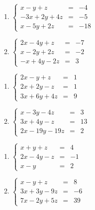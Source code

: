 \begin{multicols}{2}
\begin{enumerate}
\setcounter{enumi}{\value{HW}}


\item $\left\{ \begin{array}{rcr} x-y+z & = & -4 \\ -3x+2y+4z & = & -5 \\ x-5y+2z & = & -18  \end{array} \right.$
\item $\left\{ \begin{array}{rcr} 2x-4y+z & = & -7 \\ x-2y+2z & = & -2 \\ -x+4y-2z & = & 3  \end{array} \right.$


\setcounter{HW}{\value{enumi}}
\end{enumerate}
\end{multicols}



\begin{multicols}{2}
\begin{enumerate}
\setcounter{enumi}{\value{HW}}


\item $\left\{ \begin{array}{rcr} 2x-y+z & = & 1 \\ 2x+2y-z & = & 1 \\ 3x+6y+4z & = & 9  \end{array} \right.$
\item $\left\{ \begin{array}{rcr} x-3y-4z & = & 3 \\ 3x+4y-z & = & 13 \\ 2x-19y-19z & = & 2  \end{array} \right.$


\setcounter{HW}{\value{enumi}}
\end{enumerate}
\end{multicols}



\begin{multicols}{2}
\begin{enumerate}
\setcounter{enumi}{\value{HW}}


\item $\left\{ \begin{array}{rcr} x+y+z & = & 4 \\ 2x-4y-z& = & -1 \\ x-y & = & 2 \end{array} \right.$
\item $\left\{ \begin{array}{rcr} x-y+z & = & 8 \\ 3x+3y-9z & = & -6 \\  7x-2y+5z & = & 39 \end{array} \right.$


\setcounter{HW}{\value{enumi}}
\end{enumerate}
\end{multicols}



